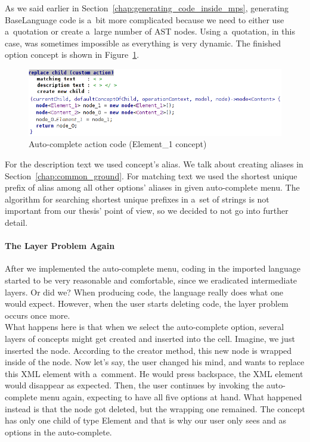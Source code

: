 As we said earlier in Section~\ref{chap:generating_code_inside_mps}, generating BaseLanguage code is a~bit more complicated because we need to either use a~quotation or create a~large number of AST nodes.
Using a~quotation, in this case, was sometimes impossible as everything is very dynamic.
The finished option concept is shown in Figure~\ref{fig:autocomplete_action}.

\begin{figure}[ht]
	\centering
	\includegraphics[width=\textwidth]{./img/autocomplete_action.png}
	\caption{Auto-complete action code (Element{\_}1 concept)}
	\label{fig:autocomplete_action}
\end{figure}

For the description text we used concept's alias.
We talk about creating aliases in Section~\ref{chap:common_ground}.
For matching text we used the shortest unique prefix of alias among all other options' aliases in given auto-complete menu.
The algorithm for searching shortest unique prefixes in a~set of strings is not important from our thesis' point of view, so we decided to not go into further detail.


\paragraph{The Layer Problem Again}

After we implemented the auto-complete menu, coding in the imported language started to be very reasonable and comfortable, since we eradicated intermediate layers.
Or did we?
When producing code, the language really does what one would expect.
However, when the user starts deleting code, the layer problem occurs once more.
\\

What happens here is that when we select the auto-complete option, several layers of concepts might get created and inserted into the cell.
Imagine, we just inserted the  node.
According to the creator method, this new node is wrapped inside of the  node.
Now let's say, the user changed his mind, and wants to replace this XML element with a~comment.
He would press backspace, the XML element would disappear as expected.
Then, the user continues by invoking the auto-complete menu again, expecting to have all five options at hand.
What happened instead is that the  node got deleted, but the wrapping  one remained.
The  concept has only one child of type Element and that is why our user only sees  and  as options in the auto-complete.


